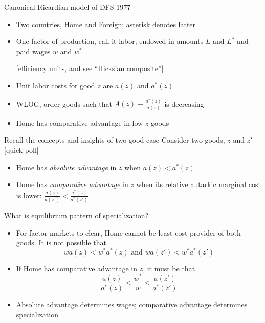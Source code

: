 \documentclass[10pt,notes=hide]{beamer}
\begin{document}
\begin{frame}{Canonical Ricardian model of DFS 1977}
\begin{itemize}
	\item Two countries, Home and Foreign; asterisk denotes latter
	\item One factor of production, call it labor, endowed in amounts $L$ and $L^*$ and paid wages $w$ and $w^*$
	\item[] [efficiency units, and see ``Hicksian composite'']
	\item Unit labor costs for good $z$ are $a(z)$ and $a^*(z)$
	\item WLOG, order goods such that $A(z) \equiv \frac{a^*(z)}{a(z)}$ is decreasing
	\item Home has comparative advantage in low-$z$ goods
\end{itemize}
\end{frame}
\begin{frame}{Recall the concepts and insights of two-good case}
Consider two goods, $z$ and $z'$
\hfill [quick poll]
\begin{itemize}
	\item Home has \textit{absolute advantage} in $z$ when $a(z) < a^*(z)$
	\item Home has \textit{comparative advantage} in $z$ when its relative autarkic marginal cost is lower: $\frac{a(z)}{a(z')} < \frac{a^*(z)}{a^*(z')}$
\end{itemize}
What is equilibrium pattern of specialization?
\begin{itemize}
	\item For factor markets to clear, Home cannot be least-cost provider of both goods. It is not possible that
	\begin{equation*}w a(z) < w^{*}a^{*}(z) \text{ and } w a(z') < w^*a^*(z')\end{equation*}
	\item If Home has comparative advantage in $z$, it must be that 
	\begin{equation*}\frac{a(z)}{a^*(z)} \leq \frac{w^{*}}{w} \leq \frac{a(z')}{a^*(z')}\end{equation*}
	\item Absolute advantage determines wages; comparative advantage determines specialization
\end{itemize}
\end{frame}
\end{document}
